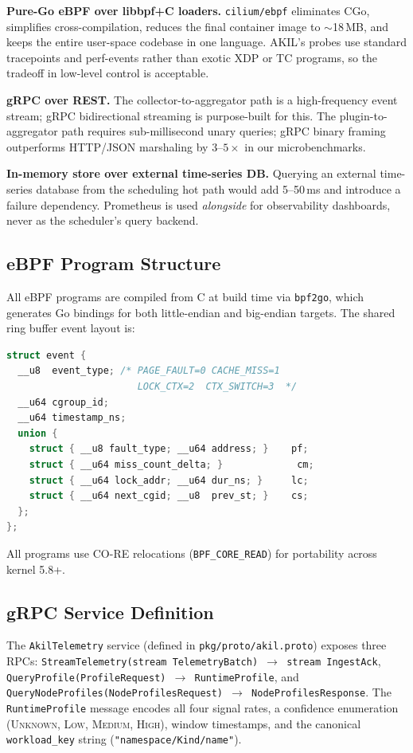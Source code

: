 \documentclass[10pt,conference,a4paper]{IEEEtran}
\begin{document}
\textbf{Pure-Go eBPF over libbpf+C loaders.}
\texttt{cilium/ebpf} eliminates CGo, simplifies cross-compilation, reduces the
final container image to $\sim$18\,MB, and keeps the entire user-space codebase
in one language. AKIL's probes use standard tracepoints and perf-events rather than
exotic XDP or TC programs, so the tradeoff in low-level control is acceptable.

\textbf{gRPC over REST.}
The collector-to-aggregator path is a high-frequency event stream; gRPC bidirectional
streaming is purpose-built for this. The plugin-to-aggregator path requires
sub-millisecond unary queries; gRPC binary framing outperforms HTTP/JSON marshaling
by $3$--$5\times$ in our microbenchmarks.

\textbf{In-memory store over external time-series DB.}
Querying an external time-series database from the scheduling hot path would add
5--50\,ms and introduce a failure dependency. Prometheus is used \emph{alongside}
for observability dashboards, never as the scheduler's query backend.

\subsection{eBPF Program Structure}

All eBPF programs are compiled from C at build time via \texttt{bpf2go}, which
generates Go bindings for both little-endian and big-endian targets.
The shared ring buffer event layout is:

\begin{lstlisting}[language=C, caption={BPF shared event struct (kernel C)}]
struct event {
  __u8  event_type; /* PAGE_FAULT=0 CACHE_MISS=1
                       LOCK_CTX=2  CTX_SWITCH=3  */
  __u64 cgroup_id;
  __u64 timestamp_ns;
  union {
    struct { __u8 fault_type; __u64 address; }    pf;
    struct { __u64 miss_count_delta; }             cm;
    struct { __u64 lock_addr; __u64 dur_ns; }     lc;
    struct { __u64 next_cgid; __u8  prev_st; }    cs;
  };
};
\end{lstlisting}

All programs use CO-RE relocations (\texttt{BPF\_CORE\_READ}) for portability
across kernel 5.8+.

\subsection{gRPC Service Definition}

The \texttt{AkilTelemetry} service (defined in \texttt{pkg/proto/akil.proto})
exposes three RPCs:
\texttt{StreamTelemetry(stream TelemetryBatch) $\to$ stream IngestAck},
\texttt{QueryProfile(ProfileRequest) $\to$ RuntimeProfile}, and
\texttt{QueryNodeProfiles(NodeProfilesRequest) $\to$ NodeProfilesResponse}.
The \texttt{RuntimeProfile} message encodes all four signal rates, a confidence
enumeration (\textsc{Unknown}, \textsc{Low}, \textsc{Medium}, \textsc{High}),
window timestamps, and the canonical
\texttt{workload\_key} string (\texttt{"namespace/Kind/name"}).
\end{document}
